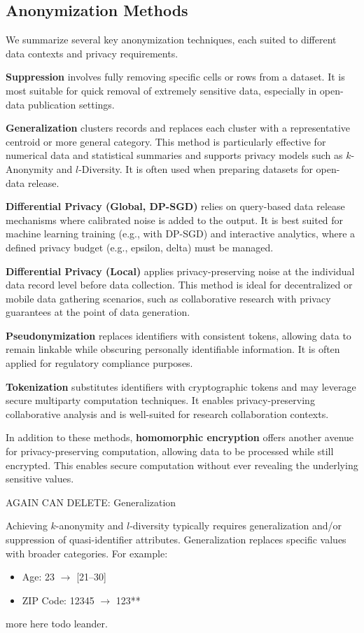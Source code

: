 \documentclass{article}
\begin{document}
\subsection{Anonymization Methods}
We summarize several key anonymization techniques, each suited to different data contexts and privacy requirements.

\textbf{Suppression} involves fully removing specific cells or rows from a dataset. It is most suitable for quick removal of extremely sensitive data, especially in open-data publication settings.

\textbf{Generalization} clusters records and replaces each cluster with a representative centroid or more general category. This method is particularly effective for numerical data and statistical summaries and supports privacy models such as $k$-Anonymity and $l$-Diversity. It is often used when preparing datasets for open-data release.

\textbf{Differential Privacy (Global, DP-SGD)} relies on query-based data release mechanisms where calibrated noise is added to the output. It is best suited for machine learning training (e.g., with DP-SGD) and interactive analytics, where a defined privacy budget (e.g., epsilon, delta) must be managed.

\textbf{Differential Privacy (Local)} applies privacy-preserving noise at the individual data record level before data collection. This method is ideal for decentralized or mobile data gathering scenarios, such as collaborative research with privacy guarantees at the point of data generation.

\textbf{Pseudonymization} replaces identifiers with consistent tokens, allowing data to remain linkable while obscuring personally identifiable information. It is often applied for regulatory compliance purposes.

\textbf{Tokenization} substitutes identifiers with cryptographic tokens and may leverage secure multiparty computation techniques. It enables privacy-preserving collaborative analysis and is well-suited for research collaboration contexts.

In addition to these methods, \textbf{homomorphic encryption} offers another avenue for privacy-preserving computation, allowing data to be processed while still encrypted. This enables secure computation without ever revealing the underlying sensitive values.

AGAIN CAN DELETE: Generalization

Achieving $k$-anonymity and $l$-diversity typically requires generalization and/or suppression of quasi-identifier attributes. Generalization replaces specific values with broader categories. For example:
\begin{itemize}
\item Age: 23 $\rightarrow$ [21--30]
\item ZIP Code: 12345 $\rightarrow$ 123**
\end{itemize}
more here todo leander.
\end{document}
